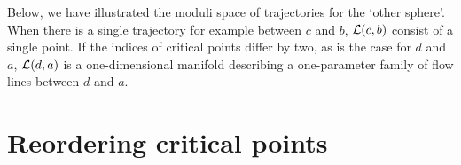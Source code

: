 \begin{eg}
    Below, we have illustrated the moduli space of trajectories for the `other sphere'.
    When there is a single trajectory for example between $c$ and  $b$, $\mathcal L(c, b)$ consist of a single point.
    If the indices of critical points differ by two, as is the case for $d$ and  $a$,  $\mathcal L(d, a)$ is a one-dimensional manifold describing a one-parameter family of flow lines between  $d$ and  $a$.
\end{eg}
\begin{figure}[H]
    \centering
\end{figure}




\filbreak
\section{Reordering critical points}
\mbox{}\\[-3em]

